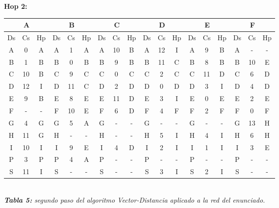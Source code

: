 \documentclass[letterpaper,10pt,onecolumn,titlepage]{article}
\begin{document}
 \textbf{Hop 2:}
 \begin{center}
   \begin{tabular}{|c|c|c|c|c|c|c|c|c|c|c|c|c|c|c|c|c|c|} \hline
     \multicolumn{3}{|c|}{A} & \multicolumn{3}{|c|}{B} & \multicolumn{3}{|c|}{C} & \multicolumn{3}{|c|}{D} & \multicolumn{3}{|c|}{E} & \multicolumn{3}{|c|}{F} \\ \hline
     Ds & Cs & Hp & Ds & Cs & Hp & Ds & Cs & Hp & Ds & Cs & Hp & Ds & Cs & Hp & Ds & Cs & Hp \\ \hline
     A  & 0  & A  & A  & 1  & A  & A  & 10  & B  & A  & \color{red}12  &\color{red} I  & A  & \color{red}9  & \color{red}B  & A  & -  & - \\ \hline
     B  & 1  & B  & B  & 0  & B  & B  & 9  & B  & B  & \color{red}11  & \color{red}C  & B  & 8  & B & B  & \color{red}10  & \color{red}E \\ \hline
     C  & \color{red}10  &\color{red} B  & C  & 9  & C  & C  & 0  & C  & C  & 2  & C  & C  & \color{red}11  & \color{red}D  & C  & \color{red}6  & \color{red}D \\ \hline
     D  & \color{red}12  & \color{red}I  & D  & \color{red}11  & \color{red}C & D  & \color{red}2  & \color{red}D  & D  & 0  & D  & D  & \color{red}3  & \color{red}I  & D  & 4  & D \\ \hline
     E  & \color{red}9  & \color{red}B  & E  & 8  & E  & E  & \color{red}11  & \color{red}D  & E  & \color{red}3  &\color{red} I  & E  & 0  & E  & E  & 2  & E \\ \hline
     F  & -  & -  & F  & \color{red}10  & \color{red}E  & F  & \color{red}6  & \color{red}D  & F  & 4  & F  & F  & 2  & F  & F  & 0  & F \\ \hline
     G  & 4  & G  & G  & \color{red}5  & \color{red}A  & G  & -  & -  & G  & -  & -  & G  & -  & -  & G  & \color{red}13  & \color{red}H \\ \hline
     H  & \color{red}11  & \color{red}G  & H  & -  & -  & H  & -  & -  & H  & \color{red}5  & \color{red}I  & H  & \color{red}4  &\color{red} I  & H  & 6  & H \\ \hline
     I  & 10  & I  & I  &\color{red} 9  & \color{red}E  & I  & \color{red}4  & \color{red}D  & I  & 2  & I  & I  & 1  & I  & I  & \color{red}3  & \color{red}E \\ \hline
     P  & 3  & P  & P  & \color{red}4  & \color{red}A  & P  & -  & -  & P  & -  & -  & P  & -  & -  & P  & -  & - \\ \hline
     S  & \color{red}11  & \color{red}I  & S  & -  & -  & S  & -  & -  & S  & \color{red}3  &\color{red} I  & S  &\color{red} 2  &\color{red} I  & S  & -  & - \\ \hline
   \end{tabular}\\
   \textit{\textbf{Tabla 5:} segundo paso del algoritmo Vector-Distancia aplicado a la red del enunciado.}
 \end{center}
 
\end{document}
